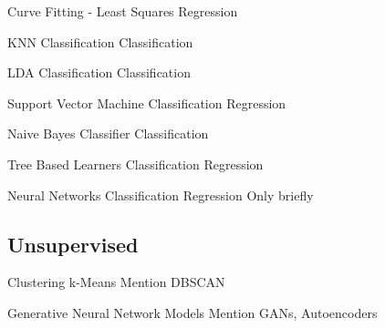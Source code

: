   \begin{frame}{Curve Fitting - Least Squares}
  Regression
  \end{frame}

  \begin{frame}{KNN Classification}
  Classification
  \end{frame}

  \begin{frame}{LDA Classification}
  Classification
  \end{frame}

  \begin{frame}{Support Vector Machine}
  Classification
  Regression
  \end{frame}

  \begin{frame}{Naive Bayes Classifier}
  Classification
  \end{frame}

  \begin{frame}{Tree Based Learners}
  Classification
  Regression
  \end{frame}

  \begin{frame}{Neural Networks}
  Classification
  Regression
  Only briefly
  \end{frame}

  \subsection{Unsupervised}

  \begin{frame}{Clustering}
  k-Means
  Mention DBSCAN
  \end{frame}

  \begin{frame}{Generative Neural Network Models}
  Mention GANs, Autoencoders
  \end{frame}




